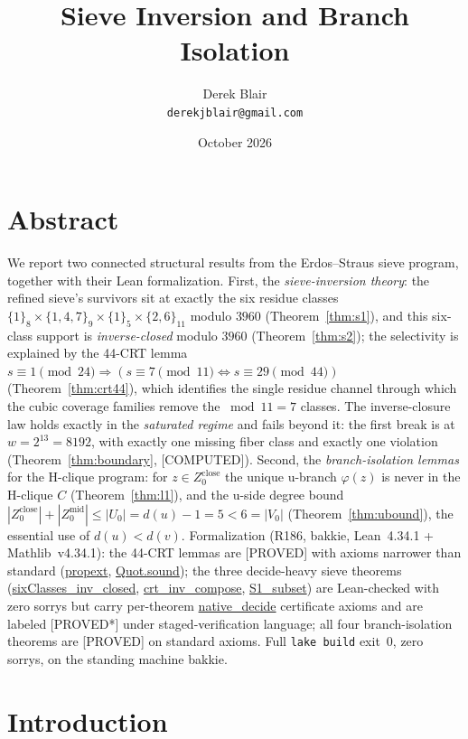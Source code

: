 \documentclass[11pt,a4paper]{article}
\title{Sieve Inversion and Branch Isolation}
\author{Derek Blair \\ \texttt{derekjblair@gmail.com}}
\date{October 2026}
\theoremstyle{definition}
\begin{document}
\maketitle

\section{Abstract}

We report two connected structural results from the Erdos--Straus
sieve program, together with their Lean formalization. First, the
\emph{sieve-inversion theory}: the refined sieve's survivors sit at
exactly the six residue classes
$\{1\}_8\times\{1,4,7\}_9\times\{1\}_5\times\{2,6\}_{11}$ modulo
$3960$ (Theorem~\ref{thm:s1}), and this six-class support is
\emph{inverse-closed} modulo $3960$ (Theorem~\ref{thm:s2}); the
selectivity is explained by the 44-CRT lemma
$s\equiv1\pmod{24}\Rightarrow(s\equiv7\pmod{11}\iff s\equiv29\pmod{44})$
(Theorem~\ref{thm:crt44}), which identifies the single residue channel
through which the cubic coverage families remove the
$\bmod 11=7$ classes. The inverse-closure law holds exactly in the
\emph{saturated regime} and fails beyond it: the first break is at
$w=2^{13}=8192$, with exactly one missing fiber class and exactly one
violation (Theorem~\ref{thm:boundary}, [COMPUTED]).
Second, the \emph{branch-isolation lemmas} for the H-clique program:
for $z\in Z_0^{\mathrm{close}}$ the unique u-branch $\varphi(z)$ is never
in the H-clique $C$ (Theorem~\ref{thm:l1}), and the u-side degree bound
$|Z_0^{\mathrm{close}}|+|Z_0^{\mathrm{mid}}|\le|U_0|=d(u)-1=5<6=|V_0|$
(Theorem~\ref{thm:ubound}), the essential use of $d(u)<d(v)$.
Formalization (R186, bakkie, Lean~4.34.1 + Mathlib~v4.34.1): the 44-CRT
lemmas are [PROVED] with axioms narrower than standard
(\url{propext}, \url{Quot.sound}); the three decide-heavy sieve
theorems (\url{sixClasses_inv_closed}, \url{crt_inv_compose},
\url{S1_subset}) are Lean-checked with zero sorrys but carry
per-theorem \url{native_decide} certificate axioms and are labeled
[PROVED*] under staged-verification language; all four branch-isolation
theorems are [PROVED] on standard axioms. Full \texttt{lake build}
exit~0, zero sorrys, on the standing machine bakkie.

\section{Introduction}
\end{document}
